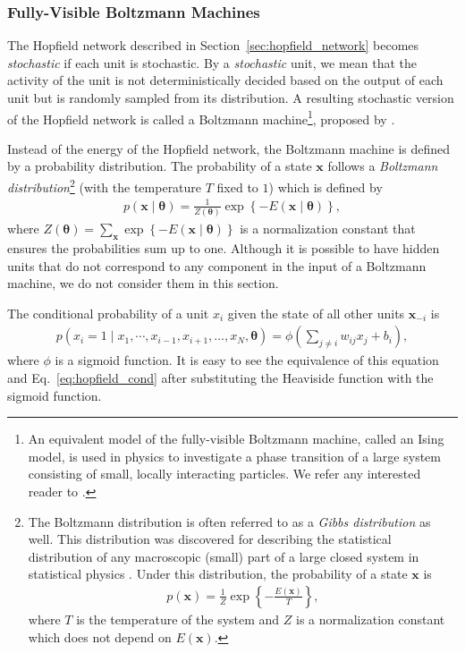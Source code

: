 \documentclass[dissertation,nocontribution,draft*]{aaltoseries}
\newcommand{\vect}[1]{\mathbf{#1}}
\newcommand{\vects}[1]{\boldsymbol{#1}}
\newcommand{\vx}[0]{\vect{x}}
\newcommand{\TT}[0]{{\vects{\theta}}}
\begin{document}
\subsubsection{Fully-Visible Boltzmann Machines}
\label{sec:fvbm}

The Hopfield network described in
Section~\ref{sec:hopfield_network} becomes
\textit{stochastic} if each unit is stochastic.
By a \textit{stochastic} unit, we mean that the activity of
the unit is not deterministically decided based on the
output of each unit but is randomly sampled from its
distribution.  A resulting stochastic version of the Hopfield
network is called a Boltzmann machine\footnote{ An
equivalent model of the fully-visible Boltzmann machine,
called an Ising model, is used in physics to investigate a
phase transition of a large system consisting of small,
locally interacting particles. We refer any interested
reader to \citep[][and references therein]{Cipra1987}.  },
proposed by \citet{Ackley1985}. 

Instead of the energy of the Hopfield network, the Boltzmann
machine is defined by a probability distribution. The
probability of a state $\vx$ follows a \textit{Boltzmann
distribution}\footnote{The Boltzmann distribution is often
referred to as a \textit{Gibbs distribution} as well. This
distribution was discovered for describing the statistical
distribution of any macroscopic (small) part of a large
closed system in statistical physics \citep[see,
e.g.,][]{Landau1980}. Under this distribution, the
probability of a state $\vx$ is
\begin{align*}
    p(\vx) = \frac{1}{Z} \exp\left\{ -\frac{E(\vx)}{T}
    \right\},
\end{align*}
where $T$ is the temperature of the system and $Z$ is a
normalization constant which does not depend on $E(\vx)$.
}
(with the temperature $T$ fixed to $1$) which is
defined by
\begin{align}
    \label{eq:bm}
    p(\vx \mid \TT) = \frac{1}{Z(\TT)} \exp \left\{
    -E\left(\vx \mid \TT \right)\right\},
\end{align}
where $Z(\TT)=\sum_{\vx} \exp\left\{ -E(\vx \mid \TT)
\right\}$ is a normalization constant that ensures the
probabilities sum up to one. Although it is possible to have
hidden units that do not correspond to any component in the
input of a Boltzmann machine, we do not consider them in this
section.

The conditional probability of a unit $x_i$ given the state
of all other units $\vx_{-i}$ is
\begin{align}
    \label{eq:bm_cond}
    p(x_i = 1 \mid x_1, \cdots, x_{i-1}, x_{i+1}, \dots ,x_N,
    \TT) = \phi\left( \sum_{j \neq i} w_{ij} x_j + b_i
    \right),
\end{align}
where $\phi$ is a sigmoid function. It is easy to see the
equivalence of this equation and
Eq.~\eqref{eq:hopfield_cond} after substituting the
Heaviside function with the sigmoid function. 
\end{document}
